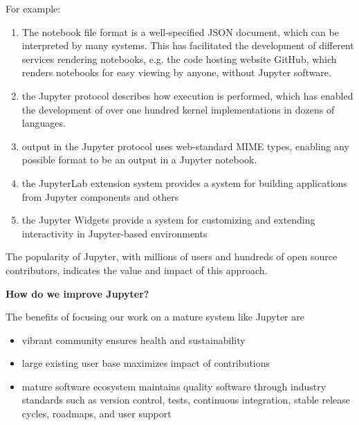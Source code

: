 For example:

\begin{enumerate}
    \item The notebook file format is a well-specified JSON document,
    which can be interpreted by many systems.
    This has facilitated the development of different services
    rendering notebooks, e.g. the code hosting website GitHub,
    which renders notebooks for easy viewing by anyone,
    without Jupyter software.
    \item the Jupyter protocol describes how execution is performed,
          which has enabled the development of over one hundred
          kernel implementations in dozens of languages.
    \item output in the Jupyter protocol uses web-standard MIME types,
          enabling any possible format to be an output in a Jupyter notebook.
    \item the JupyterLab extension system provides a system for building applications
          from Jupyter components and others
    \item the Jupyter Widgets provide a system for customizing and extending
          interactivity in Jupyter-based environments
\end{enumerate}

The popularity of Jupyter, with millions of users and hundreds of open source contributors,
indicates the value and impact of this approach.

\textbf{How do we improve Jupyter?}

The benefits of focusing our work on a mature system like Jupyter are

\begin{itemize}
    \item vibrant community ensures health and sustainability
    \item large existing user base maximizes impact of contributions
    \item mature software ecosystem maintains quality software through
          industry standards such as version control, tests, continuous integration,
          stable release cycles, roadmaps, and user support
\end{itemize}

